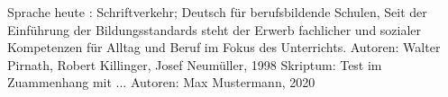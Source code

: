 %
\begin{thebibliography}{22}
%
%
    Sprache heute : Schriftverkehr; Deutsch für berufsbildende Schulen,\newline 
Seit der Einführung der Bildungsstandards steht der Erwerb fachlicher und sozialer Kompetenzen für Alltag und Beruf im Fokus des Unterrichts.\newline
Autoren: Walter Pirnath, Robert Killinger, Josef Neumüller, 1998
%
 Skriptum: Test im Zuammenhang mit  ...\newline 
Autoren: Max Mustermann, 2020
%
%
%
\end{thebibliography}
